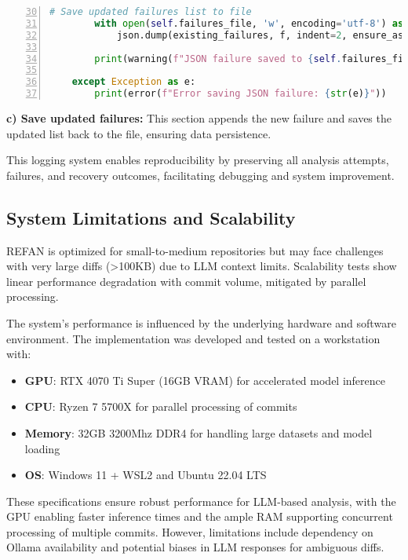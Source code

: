 \begin{lstlisting}[language=Python, numbers=left, firstnumber=30]
        # Save updated failures list to file
        with open(self.failures_file, 'w', encoding='utf-8') as f:
            json.dump(existing_failures, f, indent=2, ensure_ascii=False)
        
        print(warning(f"JSON failure saved to {self.failures_file} (total: {len(existing_failures)} failures)"))
        
    except Exception as e:
        print(error(f"Error saving JSON failure: {str(e)}"))
\end{lstlisting}

\textbf{c) Save updated failures:} This section appends the new failure and saves the updated list back to the file, ensuring data persistence.

This logging system enables reproducibility by preserving all analysis attempts, failures, and recovery outcomes, facilitating debugging and system improvement.

\subsection{System Limitations and Scalability}
REFAN is optimized for small-to-medium repositories but may face challenges with very large diffs (>100KB) due to LLM context limits. Scalability tests show linear performance degradation with commit volume, mitigated by parallel processing.

The system's performance is influenced by the underlying hardware and software environment. The implementation was developed and tested on a workstation with:

\begin{itemize}
    \item \textbf{GPU}: RTX 4070 Ti Super (16GB VRAM) for accelerated model inference
    \item \textbf{CPU}: Ryzen 7 5700X for parallel processing of commits
    \item \textbf{Memory}: 32GB 3200Mhz DDR4 for handling large datasets and model loading
    \item \textbf{OS}: Windows 11 + WSL2 and Ubuntu 22.04 LTS
\end{itemize}

These specifications ensure robust performance for LLM-based analysis, with the GPU enabling faster inference times and the ample RAM supporting concurrent processing of multiple commits. However, limitations include dependency on Ollama availability and potential biases in LLM responses for ambiguous diffs.


